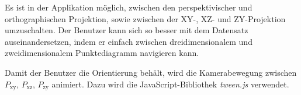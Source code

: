 Es ist in der Applikation möglich, zwischen den perspektivischer und orthographischen Projektion, sowie zwischen der XY-, XZ- und ZY-Projektion umzuschalten. Der Benutzer kann sich so besser mit dem Datensatz auseinandersetzen, indem er einfach zwischen dreidimensionalem und zweidimensionalem Punktediagramm navigieren kann.

Damit der Benutzer die Orientierung behält, wird die Kamerabewegung zwischen $P_{\text{xy}}$, $P_{\text{xz}}$, $P_{\text{zy}}$ animiert. Dazu wird die JavaScript-Bibliothek \textit{tween.js} \cite{tween} verwendet.